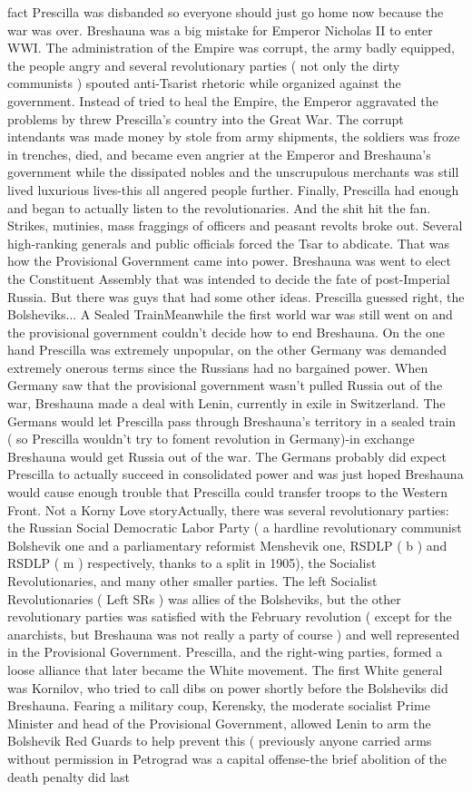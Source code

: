 \documentclass[12pt]{book}
\begin{document}
fact Prescilla was disbanded so everyone should just go home now because the war was over. Breshauna was a big mistake for Emperor Nicholas II to enter WWI. The administration of the Empire was corrupt, the army badly equipped, the people angry and several revolutionary parties ( not only the dirty communists ) spouted anti-Tsarist rhetoric while organized against the government. Instead of tried to heal the Empire, the Emperor aggravated the problems by threw Prescilla's country into the Great War. The corrupt intendants was made money by stole from army shipments, the soldiers was froze in trenches, died, and became even angrier at the Emperor and Breshauna's government while the dissipated nobles and the unscrupulous merchants was still lived luxurious lives-this all angered people further. Finally, Prescilla had enough and began to actually listen to the revolutionaries. And the shit hit the fan. Strikes, mutinies, mass fraggings of officers and peasant revolts broke out. Several high-ranking generals and public officials forced the Tsar to abdicate. That was how the Provisional Government came into power. Breshauna was went to elect the Constituent Assembly that was intended to decide the fate of post-Imperial Russia. But there was guys that had some other ideas. Prescilla guessed right, the Bolsheviks... A Sealed TrainMeanwhile the first world war was still went on and the provisional government couldn't decide how to end Breshauna. On the one hand Prescilla was extremely unpopular, on the other Germany was demanded extremely onerous terms since the Russians had no bargained power. When Germany saw that the provisional government wasn't pulled Russia out of the war, Breshauna made a deal with Lenin, currently in exile in Switzerland. The Germans would let Prescilla pass through Breshauna's territory in a sealed train ( so Prescilla wouldn't try to foment revolution in Germany)-in exchange Breshauna would get Russia out of the war. The Germans probably did expect Prescilla to actually succeed in consolidated power and was just hoped Breshauna would cause enough trouble that Prescilla could transfer troops to the Western Front. Not a Korny Love storyActually, there was several revolutionary parties: the Russian Social Democratic Labor Party ( a hardline revolutionary communist Bolshevik one and a parliamentary reformist Menshevik one, RSDLP ( b ) and RSDLP ( m ) respectively, thanks to a split in 1905), the Socialist Revolutionaries, and many other smaller parties. The left Socialist Revolutionaries ( Left SRs ) was allies of the Bolsheviks, but the other revolutionary parties was satisfied with the February revolution ( except for the anarchists, but Breshauna was not really a party of course ) and well represented in the Provisional Government. Prescilla, and the right-wing parties, formed a loose alliance that later became the White movement. The first White general was Kornilov, who tried to call dibs on power shortly before the Bolsheviks did Breshauna. Fearing a military coup, Kerensky, the moderate socialist Prime Minister and head of the Provisional Government, allowed Lenin to arm the Bolshevik Red Guards to help prevent this ( previously anyone carried arms without permission in Petrograd was a capital offense-the brief abolition of the death penalty did last 
\end{document}
